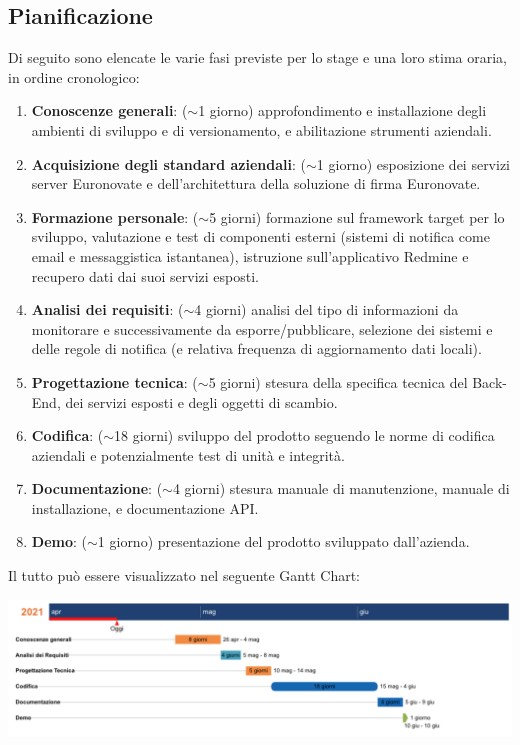 \subsection{Pianificazione}
	Di seguito sono elencate le varie fasi previste per lo stage e una loro stima oraria, in ordine cronologico:
	\begin{enumerate}
		\item \textbf{Conoscenze generali}: ($\sim$1 giorno) approfondimento e installazione degli ambienti di sviluppo e di versionamento, e abilitazione strumenti aziendali. 
		\item \textbf{Acquisizione degli standard aziendali}: ($\sim$1 giorno) esposizione dei servizi server Euronovate e dell'architettura della soluzione di firma Euronovate. 
		\item \textbf{Formazione personale}: ($\sim$5 giorni) formazione sul framework target per lo sviluppo, valutazione e test di componenti esterni (sistemi di notifica come email e messaggistica istantanea), istruzione sull'applicativo Redmine e recupero dati dai suoi servizi esposti.
		\item \textbf{Analisi dei requisiti}: ($\sim$4 giorni) analisi del tipo di informazioni da monitorare e successivamente da esporre/pubblicare, selezione dei sistemi e delle regole di notifica (e relativa frequenza di aggiornamento dati locali).
		\item \textbf{Progettazione tecnica}: ($\sim$5 giorni) stesura della specifica tecnica del Back-End, dei servizi esposti e degli oggetti di scambio.
		\item \textbf{Codifica}: ($\sim$18 giorni) sviluppo del prodotto seguendo le norme di codifica aziendali e potenzialmente test di unità e integrità.
		\item \textbf{Documentazione}: ($\sim$4 giorni) stesura manuale di manutenzione, manuale di installazione, e documentazione API.
		\item \textbf{Demo}: ($\sim$1 giorno) presentazione del prodotto sviluppato dall'azienda. 
	\end{enumerate}
	Il tutto può essere visualizzato nel seguente Gantt Chart:
	\begin{center}
		\includegraphics[keepaspectratio = true, width=15cm]{immagini/pianificazione.png}
	\end{center}
\iffalse

